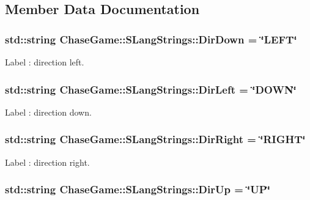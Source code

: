 \subsection{Member Data Documentation}
\hypertarget{struct_chase_game_1_1_s_lang_strings_acdb25c93c1bfd59df237ea8a9d3c1dff}{
\subsubsection[{Dir\-Down}]{\setlength{\rightskip}{0pt plus 5cm}std\-::string Chase\-Game\-::\-S\-Lang\-Strings\-::\-Dir\-Down = \char`\"{}L\-E\-F\-T\char`\"{}}}\label{struct_chase_game_1_1_s_lang_strings_acdb25c93c1bfd59df237ea8a9d3c1dff}


Label \-: direction left. 

\hypertarget{struct_chase_game_1_1_s_lang_strings_a4ca93fbfa4edbcc41c95bd1063e6e334}{
\subsubsection[{Dir\-Left}]{\setlength{\rightskip}{0pt plus 5cm}std\-::string Chase\-Game\-::\-S\-Lang\-Strings\-::\-Dir\-Left = \char`\"{}D\-O\-W\-N\char`\"{}}}\label{struct_chase_game_1_1_s_lang_strings_a4ca93fbfa4edbcc41c95bd1063e6e334}


Label \-: direction down. 

\hypertarget{struct_chase_game_1_1_s_lang_strings_a72eca1e0efc7ab4c6900c4f75322f0dc}{
\subsubsection[{Dir\-Right}]{\setlength{\rightskip}{0pt plus 5cm}std\-::string Chase\-Game\-::\-S\-Lang\-Strings\-::\-Dir\-Right = \char`\"{}R\-I\-G\-H\-T\char`\"{}}}\label{struct_chase_game_1_1_s_lang_strings_a72eca1e0efc7ab4c6900c4f75322f0dc}


Label \-: direction right. 

\hypertarget{struct_chase_game_1_1_s_lang_strings_adf4565dfe8e7ea901505441091d06b0c}{
\subsubsection[{Dir\-Up}]{\setlength{\rightskip}{0pt plus 5cm}std\-::string Chase\-Game\-::\-S\-Lang\-Strings\-::\-Dir\-Up = \char`\"{}U\-P\char`\"{}}}\label{struct_chase_game_1_1_s_lang_strings_adf4565dfe8e7ea901505441091d06b0c}


